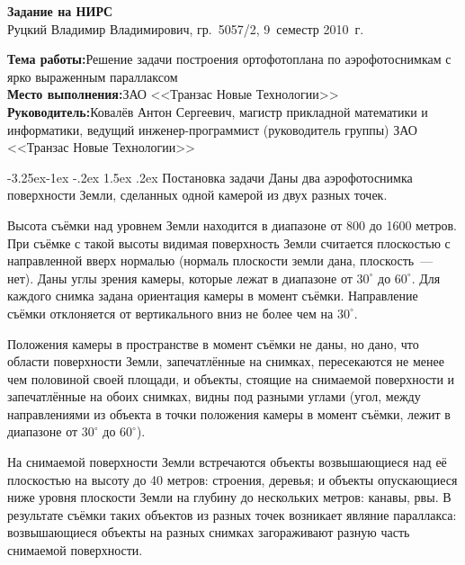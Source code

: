 \documentclass[a4paper,10pt]{article}
\makeatletter
\renewcommand\paragraph{\@startsection{paragraph}{4}{\z@}%
  {-3.25ex\@plus -1ex \@minus -.2ex}%
  {1.5ex \@plus .2ex}%
  {\normalfont\normalsize\bfseries}}
\makeatother
\begin{document}

\begin{center}
\begin{spacing}{1.3}
  {\Large\bfseries Задание на НИРС} \\
  {\large Руцкий Владимир Владимирович, гр.~5057/2, 9~семестр 2010~г.}
\end{spacing}
\end{center}

\noindent\textbf{Тема работы:}\quad Решение задачи построения ортофотоплана по аэрофотоснимкам с ярко выраженным параллаксом \\
\textbf{Место выполнения:}\quad ЗАО <<Транзас Новые Технологии>> \\
\textbf{Руководитель:}\quad Ковалёв Антон Сергеевич, 
магистр прикладной математики и информатики, 
ведущий инженер-программист (руководитель группы) ЗАО <<Транзас Новые Технологии>>

\paragraph{Постановка задачи}
Даны два аэрофотоснимка поверхности Земли, сделанных одной камерой из двух разных точек.

Высота съёмки над уровнем Земли находится в диапазоне от 800 до 1600 метров.
При съёмке с такой высоты видимая поверхность Земли считается плоскостью с направленной вверх нормалью 
(нормаль плоскости земли дана, плоскость~--- нет).
Даны углы зрения камеры, которые лежат в диапазоне от $30^{\circ}$ до $60^{\circ}$.
Для каждого снимка задана ориентация камеры в момент съёмки.
Направление съёмки отклоняется от вертикального вниз не более чем на $30^{\circ}$.

Положения камеры в пространстве в момент съёмки не даны, но
дано, что области поверхности Земли, запечатлённые на снимках, пересекаются не менее чем половиной своей площади,
и объекты, стоящие на снимаемой поверхности и запечатлённые на обоих снимках, видны под разными углами 
(угол, между направлениями из объекта в точки положения камеры в момент съёмки, 
лежит в диапазоне от $30^{\circ}$ до $60^{\circ}$).

На снимаемой поверхности Земли встречаются объекты возвышающиеся над её плоскостью на высоту до 40 метров: 
строения, деревья; 
и объекты опускающиеся ниже уровня плоскости Земли на глубину до нескольких метров: канавы, рвы.
В результате съёмки таких объектов из разных точек возникает являние параллакса:
возвышающиеся объекты на разных снимках загораживают разную часть снимаемой поверхности.
\end{document}
